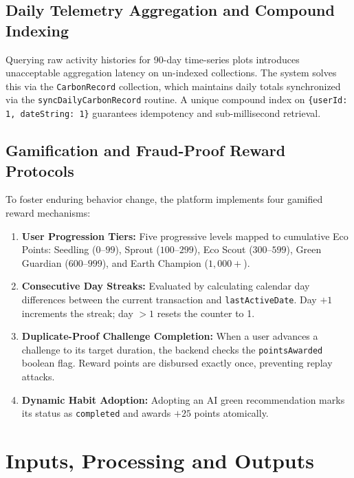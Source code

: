 \documentclass[12pt,a4paper]{article}
\begin{document}
\subsection{Daily Telemetry Aggregation and Compound Indexing}
Querying raw activity histories for 90-day time-series plots introduces unacceptable aggregation latency on un-indexed collections. The system solves this via the \texttt{CarbonRecord} collection, which maintains daily totals synchronized via the \texttt{syncDailyCarbonRecord} routine. A unique compound index on \texttt{\{userId: 1, dateString: 1\}} guarantees idempotency and sub-millisecond retrieval.

\subsection{Gamification and Fraud-Proof Reward Protocols}
To foster enduring behavior change, the platform implements four gamified reward mechanisms:
\begin{enumerate}
    \item \textbf{User Progression Tiers:} Five progressive levels mapped to cumulative Eco Points: Seedling ($0\text{--}99$), Sprout ($100\text{--}299$), Eco Scout ($300\text{--}599$), Green Guardian ($600\text{--}999$), and Earth Champion ($1{,}000+$).
    \item \textbf{Consecutive Day Streaks:} Evaluated by calculating calendar day differences between the current transaction and \texttt{lastActiveDate}. Day $+1$ increments the streak; day $>1$ resets the counter to 1.
    \item \textbf{Duplicate-Proof Challenge Completion:} When a user advances a challenge to its target duration, the backend checks the \texttt{pointsAwarded} boolean flag. Reward points are disbursed exactly once, preventing replay attacks.
    \item \textbf{Dynamic Habit Adoption:} Adopting an AI green recommendation marks its status as \texttt{completed} and awards $+25$ points atomically.
\end{enumerate}

\section{Inputs, Processing and Outputs}
\end{document}
